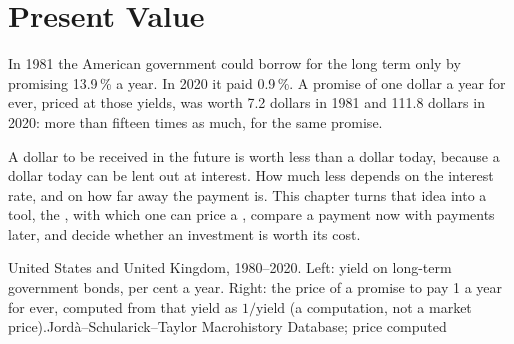\chapter{Present Value}\label{ch:g12:present-value}

In 1981 the American government could borrow for the long term only by promising 13.9\,\% a year. In 2020 it paid 0.9\,\%. A promise of one dollar a year for ever, priced
at those yields, was worth 7.2 dollars in 1981 and 111.8 dollars in 2020: more than fifteen times as much, for the same promise.

A dollar to be received in the future is worth less than a dollar today, because a dollar today can be lent out at interest. How much less depends on the interest rate,
and on how far away the payment is. This chapter turns that idea into a tool, the , with which one can price a , compare a payment now with payments
later, and decide whether an investment is worth its cost.

\begin{openingchart}{United States and United Kingdom, 1980--2020. Left: yield on long-term government bonds, per cent a year. Right: the price of a promise to pay 1 a year
for ever, computed from that yield as $1/\text{yield}$ (a computation, not a market price).}{Jordà--Schularick--Taylor Macrohistory Database; price computed}
\end{openingchart}

